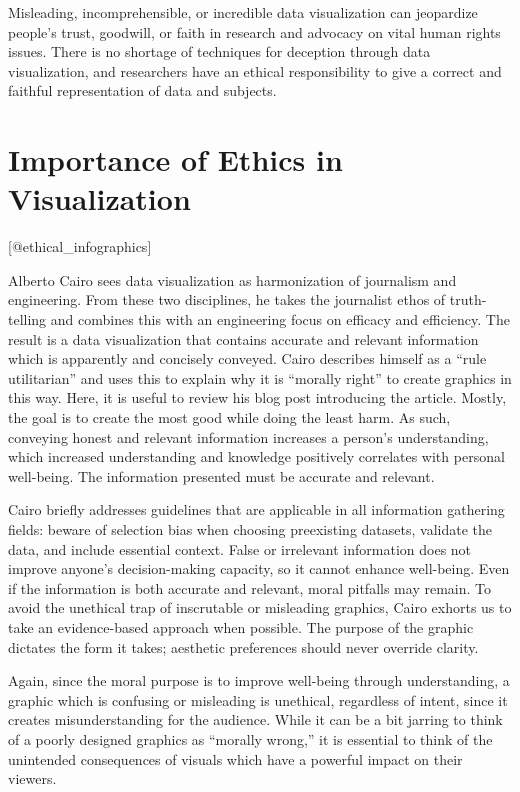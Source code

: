 \documentclass[]{book}
\theoremstyle{definition}
\theoremstyle{definition}
\theoremstyle{definition}
\theoremstyle{remark}
\begin{document}
Misleading, incomprehensible, or incredible data visualization can
jeopardize people's trust, goodwill, or faith in research and advocacy
on vital human rights issues. There is no shortage of techniques for
deception through data visualization, and researchers have an ethical
responsibility to give a correct and faithful representation of data and
subjects.

\section{Importance of Ethics in
Visualization}\label{importance-of-ethics-in-visualization}

{[}@ethical\_infographics{]}

Alberto Cairo sees data visualization as harmonization of journalism and
engineering. From these two disciplines, he takes the journalist ethos
of truth-telling and combines this with an engineering focus on efficacy
and efficiency. The result is a data visualization that contains
accurate and relevant information which is apparently and concisely
conveyed. Cairo describes himself as a ``rule utilitarian'' and uses
this to explain why it is ``morally right'' to create graphics in this
way. Here, it is useful to review his blog post introducing the article.
Mostly, the goal is to create the most good while doing the least harm.
As such, conveying honest and relevant information increases a person's
understanding, which increased understanding and knowledge positively
correlates with personal well-being. The information presented must be
accurate and relevant.

Cairo briefly addresses guidelines that are applicable in all
information gathering fields: beware of selection bias when choosing
preexisting datasets, validate the data, and include essential context.
False or irrelevant information does not improve anyone's
decision-making capacity, so it cannot enhance well-being. Even if the
information is both accurate and relevant, moral pitfalls may remain. To
avoid the unethical trap of inscrutable or misleading graphics, Cairo
exhorts us to take an evidence-based approach when possible. The purpose
of the graphic dictates the form it takes; aesthetic preferences should
never override clarity.

Again, since the moral purpose is to improve well-being through
understanding, a graphic which is confusing or misleading is unethical,
regardless of intent, since it creates misunderstanding for the
audience. While it can be a bit jarring to think of a poorly designed
graphics as ``morally wrong,'' it is essential to think of the
unintended consequences of visuals which have a powerful impact on their
viewers.
\end{document}
